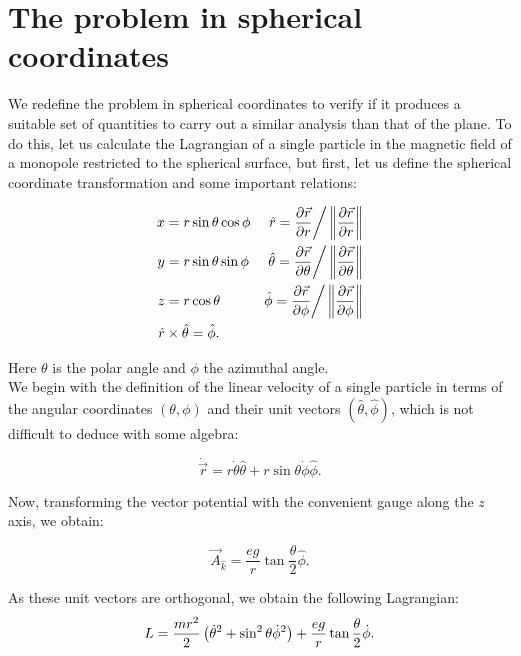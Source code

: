 \section{The problem in spherical coordinates}
We redefine the problem in spherical coordinates to verify if it produces a suitable set of quantities to carry out a similar analysis than that of the plane. To do this, let us calculate the Lagrangian of a single particle in the magnetic field of a monopole restricted to the spherical surface, but first, let us define the spherical coordinate transformation and some important relations:

\begin{align*}
x &= r\sin{\theta}\cos{\phi} & \hat{r} = \frac{\partial \vec{r}}{\partial r}\bigg/\left\lVert \frac{\partial \vec{r}}{\partial r} \right\rVert\\
y &= r\sin{\theta}\sin{\phi} & \hat{\theta} = \frac{\partial \vec{r}}{\partial \theta}\bigg/\left\lVert \frac{\partial \vec{r}}{\partial \theta} \right\rVert \\
z &= r\cos{\theta} & \hat{\phi} = \frac{\partial \vec{r}}{\partial \phi}\bigg/\left\lVert \frac{\partial \vec{r}}{\partial \phi} \right\rVert\\
\hat{r}&\times \hat{\theta} = \hat{\phi}.
\end{align*}

Here $\theta$ is the polar angle and $\phi$ the azimuthal angle.\\

We begin with the definition of the  linear velocity of a single particle in terms of the angular coordinates $(\theta,\phi)$ and their unit vectors $(\hat{\theta},\hat{\phi})$, which is not difficult to deduce with some algebra:

\begin{equation}
\dot{\vec{r}} = r\dot{\theta}\hat{\theta} + r\sin{\theta}\dot{\phi}\hat{\phi}.
\end{equation}

Now, transforming the vector potential with the convenient gauge along the $z$ axis, we obtain:

\begin{equation*}
\vec{A}_{\hat{k}} = \frac{eg}{r}\tan{\frac{\theta}{2}}\hat{\phi}.
\end{equation*}

As these unit vectors are orthogonal, we obtain the following Lagrangian:\\

\begin{equation*}
L = \frac{mr^2}{2}\left( \dot{\theta}^2 + \sin^2\theta \dot{\phi}^2 \right) + \frac{eg}{r}\tan{\frac{\theta}{2}\dot{\phi}}.
\end{equation*}

